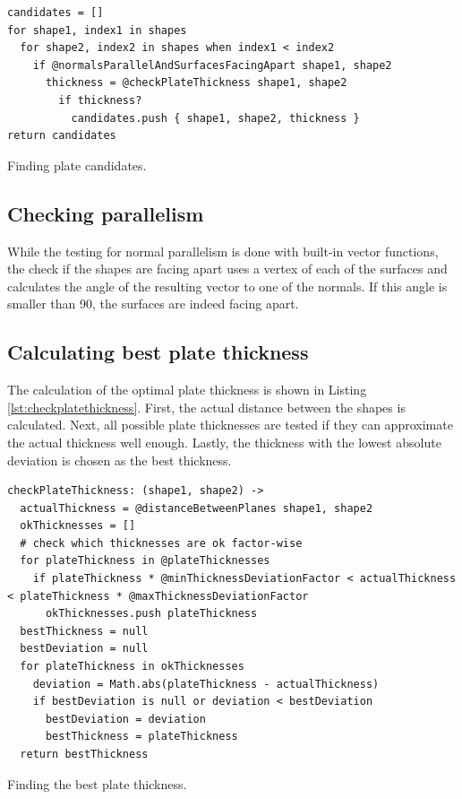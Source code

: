 \documentclass[../ClassicThesis.tex]{subfiles}
\begin{document}
\begin{listing}
\begin{verbatim}
candidates = []
for shape1, index1 in shapes
  for shape2, index2 in shapes when index1 < index2
    if @normalsParallelAndSurfacesFacingApart shape1, shape2
      thickness = @checkPlateThickness shape1, shape2
        if thickness?
          candidates.push { shape1, shape2, thickness }
return candidates
\end{verbatim}
\caption{Finding plate candidates.}
\label{lst:platecand}
\end{listing}

\subsection{Checking parallelism}

While the testing for normal parallelism is done with built-in vector functions, the check if the shapes are facing apart uses a vertex of each of the surfaces and calculates the angle of the resulting vector to one of the normals. If this angle is smaller than 90\textdegree, the surfaces are indeed facing apart.

\subsection{Calculating best plate thickness}

The calculation of the optimal plate thickness is shown in Listing \ref{lst:checkplatethickness}. First, the actual distance between the shapes is calculated. Next, all possible plate thicknesses are tested if they can approximate the actual thickness well enough. Lastly, the thickness with the lowest absolute deviation is chosen as the best thickness.

\begin{listing}
\begin{verbatim}
checkPlateThickness: (shape1, shape2) ->
  actualThickness = @distanceBetweenPlanes shape1, shape2
  okThicknesses = []
  # check which thicknesses are ok factor-wise
  for plateThickness in @plateThicknesses
    if plateThickness * @minThicknessDeviationFactor < actualThickness < plateThickness * @maxThicknessDeviationFactor
      okThicknesses.push plateThickness
  bestThickness = null
  bestDeviation = null
  for plateThickness in okThicknesses
    deviation = Math.abs(plateThickness - actualThickness)
    if bestDeviation is null or deviation < bestDeviation
      bestDeviation = deviation
      bestThickness = plateThickness
  return bestThickness
\end{verbatim}
\caption{Finding the best plate thickness.}
\label{lst:checkplatethickness}
\end{listing}
\end{document}
